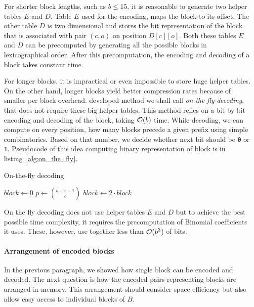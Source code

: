 For shorter block lengths, such as $b\leq 15$, it is reasonable to generate two helper tables $E$ and $D$.
Table $E$ used for the encoding, maps the block to its offset. The other table $D$ is two dimensional and
stores the bit representation of the block that is associated with pair $(c, o)$ on position $D[c][o]$.
Both these tables $E$ and $D$ can be precomputed by generating all the possible blocks in lexicographical
order. After this precomputation, the encoding and decoding of a block takes constant time.

For longer blocks, it is impractical or even impossible to store huge helper tables. On the other
hand, longer blocks yield better compression rates because of smaller per block overhead. \cite{navarro2012fast}
developed method we shall call \textit{on the fly-decoding}, that does not require these big helper tables. 
This method relies on a bit by bit encoding and decoding of the block, taking $\mathcal{O}(b)$ time. While decoding,
we can compute on every position, how many blocks precede a given prefix using simple combinatorics. Based on
that number, we decide whether next bit should be {\tt 0} or {\tt 1}. Pseudocode of this idea computing binary
representation of block is in listing~\ref{alg:on_the_fly}.

\begin{algorithm}
\caption{On-the-fly decoding}\label{alg:on_the_fly}
    $block \gets 0$\;
     {
        $p \gets {b-i-1\choose c}$\;
         {
            $block \gets 2\cdot block$\;
        } 
    }
\end{algorithm}

On the fly decoding does not use helper tables $E$ and $D$ but to achieve the best possible time complexity,
it requires the precomputation of Binomial coefficients it uses. These, however, use together less than $\mathcal{O}(b^3)$
of bits.

\paragraph{Arrangement of encoded blocks}

In the previous paragraph, we showed how single block can be encoded and decoded. The next question is how the
encoded pairs representing blocks are arranged in memory. This arrangement should consider space efficiency
but also allow easy access to individual blocks of $B$.

